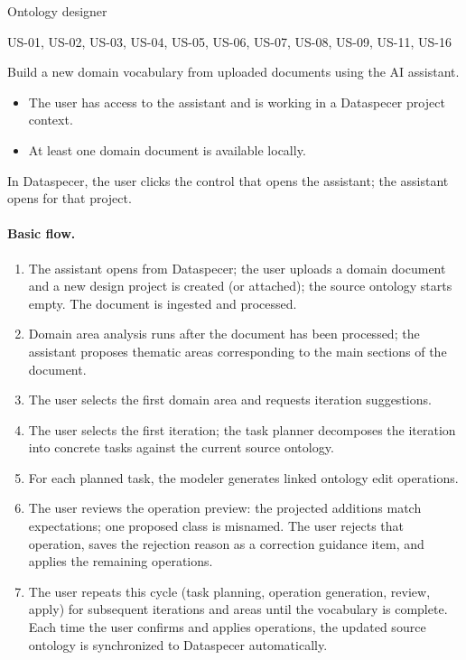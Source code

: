 \documentclass{article}
\begin{document}
\begin{description}[leftmargin=3.8cm,style=nextline]
  \item[Actors] Ontology designer
  \item[Based on user stories] US-01, US-02, US-03, US-04, US-05, US-06, US-07, US-08, US-09, US-11, US-16
  \item[Goal] Build a new domain vocabulary from uploaded documents using the AI assistant.
  \item[Pre-conditions]
    \begin{itemize}
      \item The user has access to the assistant and is working in a Dataspecer project context.
      \item At least one domain document is available locally.
    \end{itemize}
  \item[Trigger] In Dataspecer, the user clicks the control that opens the assistant; the assistant opens for that project.
\end{description}

\paragraph*{Basic flow.}
\begin{enumerate}
  \item The assistant opens from Dataspecer; the user uploads a domain document and a new design project is created (or attached); the source ontology starts empty. The document is ingested and processed.
  \item Domain area analysis runs after the document has been processed; the assistant proposes thematic areas corresponding to the main sections of the document.
  \item The user selects the first domain area and requests iteration suggestions.
  \item The user selects the first iteration; the task planner decomposes the iteration into concrete tasks against the current source ontology.
  \item For each planned task, the modeler generates linked ontology edit operations.
  \item The user reviews the operation preview: the projected additions match expectations; one proposed class is misnamed. The user rejects that operation, saves the rejection reason as a correction guidance item, and applies the remaining operations.
  \item The user repeats this cycle (task planning, operation generation, review, apply) for subsequent iterations and areas until the vocabulary is complete. Each time the user confirms and applies operations, the updated source ontology is synchronized to Dataspecer automatically.
\end{enumerate}
\end{document}
